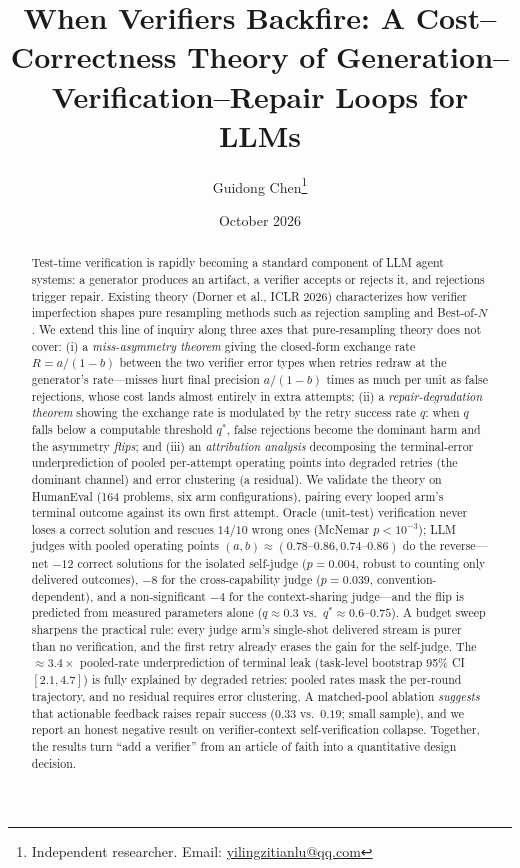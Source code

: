 \documentclass[11pt]{article}
\title{When Verifiers Backfire: A Cost--Correctness Theory of
Generation--Verification--Repair Loops for LLMs}
\author{Guidong Chen\thanks{Independent researcher. Email:
\href{mailto:yilingzitianlu@qq.com}{yilingzitianlu@qq.com}}}
\date{October 2026}
\begin{document}
\maketitle

\begin{abstract}
Test-time verification is rapidly becoming a standard component of
LLM agent systems: a generator produces an artifact, a verifier
accepts or rejects it, and rejections trigger repair.  Existing
theory (Dorner et al., ICLR 2026) characterizes how verifier
imperfection shapes pure resampling methods such as rejection
sampling and Best-of-$N$.  We extend this line of inquiry along three
axes that pure-resampling theory does not cover: (i) a
\emph{miss-asymmetry theorem} giving the closed-form exchange rate
$R = a/(1-b)$ between the two verifier error types when retries
redraw at the generator's rate---misses hurt
final precision $a/(1-b)$ times as much per unit as false rejections,
whose cost lands almost entirely in extra attempts; (ii) a
\emph{repair-degradation theorem} showing the exchange rate is
modulated by the retry success rate $q$: when $q$ falls below a
computable threshold $q^\ast$, false rejections become the dominant
harm and the asymmetry \emph{flips}; and (iii) an \emph{attribution
analysis} decomposing the terminal-error underprediction of pooled
per-attempt operating points into degraded retries (the dominant
channel) and error clustering (a residual).  We validate the
theory on HumanEval (164 problems, six arm configurations), pairing
every looped arm's terminal outcome against its own first attempt.
Oracle (unit-test) verification never loses a correct solution and
rescues $14$/$10$ wrong ones (McNemar $p < 10^{-3}$); LLM judges
with pooled operating points $(a,b) \approx (0.78\text{--}0.86,
0.74\text{--}0.86)$ do the reverse---net $-12$ correct solutions for
the isolated self-judge ($p = 0.004$, robust to counting only
delivered outcomes), $-8$ for the cross-capability judge ($p =
0.039$, convention-dependent), and a non-significant $-4$ for the
context-sharing judge---and the flip is predicted from measured
parameters alone ($q \approx 0.3$ vs.\ $q^\ast \approx 0.6$--$0.75$).
A budget sweep sharpens the practical rule: every judge arm's
single-shot delivered stream is purer than no verification, and the
first retry already erases the gain for the self-judge.  The
$\approx 3.4\times$ pooled-rate underprediction of terminal leak
(task-level bootstrap 95\% CI $[2.1, 4.7]$) is fully explained by
degraded retries: pooled rates mask the per-round trajectory, and
no residual requires error clustering.  A matched-pool ablation
\emph{suggests} that actionable feedback raises repair success
($0.33$ vs.\ $0.19$; small sample), and we report an honest
negative result on verifier-context
self-verification collapse.
Together, the results turn ``add a verifier'' from an article of
faith into a quantitative design decision.
\end{abstract}
\end{document}
